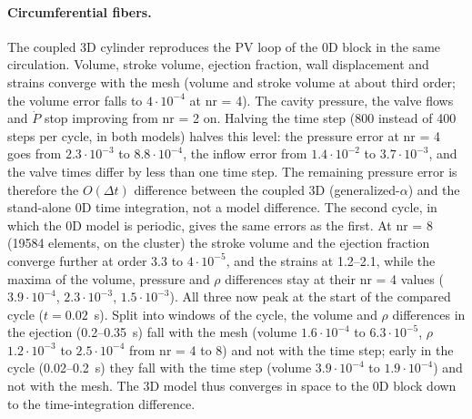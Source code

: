 \paragraph{Circumferential fibers.} The coupled 3D cylinder reproduces the PV loop of the
0D block in the same circulation. Volume, stroke volume, ejection fraction, wall
displacement and strains converge with the mesh (volume and stroke volume at about third
order; the volume error falls to $4\cdot10^{-4}$ at nr = 4). The cavity pressure, the
valve flows and $\dot P$ stop improving from nr = 2 on. Halving the time step (800 instead
of 400 steps per cycle, in both models) halves this level: the pressure error at nr = 4
goes from $2.3\cdot10^{-3}$ to $8.8\cdot10^{-4}$, the inflow error from $1.4\cdot10^{-2}$
to $3.7\cdot10^{-3}$, and the valve times differ by less than one time step. The
remaining pressure error is therefore the $O(\Delta t)$ difference between the coupled 3D
(generalized-$\alpha$) and the stand-alone 0D time integration, not a model difference.
The second cycle, in which the 0D model is periodic, gives the same errors as the first.
At nr = 8 (19584 elements, on the cluster) the stroke volume and the ejection fraction
converge further at order 3.3 to $4\cdot10^{-5}$, and the strains at 1.2--2.1, while the
maxima of the volume, pressure and $\rho$ differences stay at their nr = 4 values
($3.9\cdot10^{-4}$, $2.3\cdot10^{-3}$, $1.5\cdot10^{-3}$). All three now peak at the start of
the compared cycle ($t = 0.02$~s). Split into windows of the cycle, the volume and $\rho$
differences in the ejection (0.2--0.35~s) fall with the mesh (volume $1.6\cdot10^{-4}$ to
$6.3\cdot10^{-5}$, $\rho$ $1.2\cdot10^{-3}$ to $2.5\cdot10^{-4}$ from nr = 4 to 8) and not with
the time step; early in the cycle (0.02--0.2~s) they fall with the time step (volume
$3.9\cdot10^{-4}$ to $1.9\cdot10^{-4}$) and not with the mesh. The 3D model thus converges in
space to the 0D block down to the time-integration difference.

